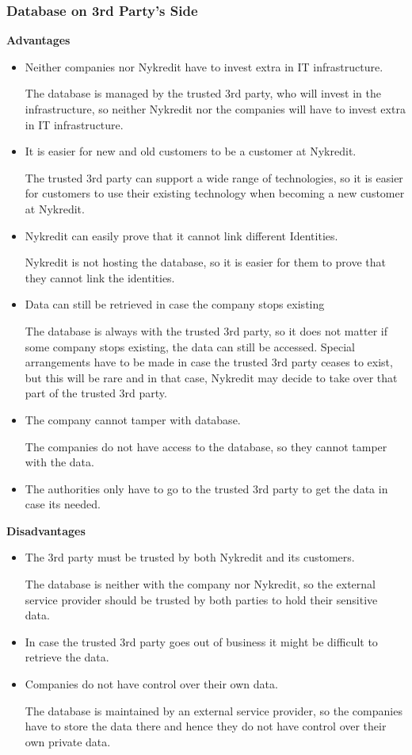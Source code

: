 \subsubsection{Database on 3rd Party's Side}
\textbf{Advantages}
\begin{itemize}
	\item Neither companies nor Nykredit have to invest extra in IT infrastructure.
	
	The database is managed by the trusted 3rd party, who will invest in the infrastructure, so neither Nykredit nor the companies will have to invest extra in IT infrastructure.
	\item It is easier for new and old customers to be a customer at Nykredit.
	
	The trusted 3rd party can support a wide range of technologies, so it is easier for customers to use their existing technology when becoming a new customer at Nykredit.
	\item Nykredit can easily prove that it cannot link different Identities.
	
	Nykredit is not hosting the database, so it is easier for them to prove that they cannot link the identities.
	\item Data can still be retrieved in case the company stops existing 
	
	The database is always with the trusted 3rd party, so it does not matter if some company stops existing, the data can still be accessed. Special arrangements have to be made in case the trusted 3rd party ceases to exist, but this will be rare and in that case, Nykredit may decide to take over that part of the trusted 3rd party.
	\item The company cannot tamper with database.
	
	The companies do not have access to the database, so they cannot tamper with the data.
	\item The authorities only have to go to the trusted 3rd party to get the data in case its needed.
\end{itemize}
\textbf{Disadvantages}
\begin{itemize}
	\item The 3rd party must be trusted by both Nykredit and its customers.
	
	The database is neither with the company nor Nykredit, so the external service provider should be trusted by both parties to hold their sensitive data.
	\item In case the trusted 3rd party goes out of business it might be difficult to retrieve the data.
	\item Companies do not have control over their own data.
	
	The database is maintained by an external service provider, so the companies have to store the data there and hence they do not have control over their own private data.
\end{itemize}
